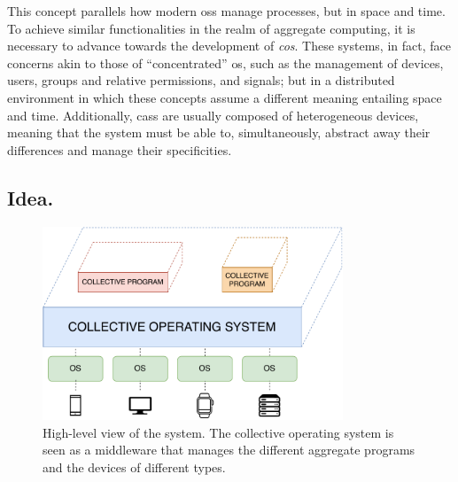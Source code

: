 \documentclass[12pt, a4paper]{article}
\begin{document}
This concept parallels how modern \acp{os} manage processes, but in space and time.
%
To achieve similar functionalities in the realm of aggregate computing,
it is necessary to advance towards the development of \emph{\ac{cos}}.
%
These systems, in fact,
face concerns akin to those of ``concentrated'' \ac{os},
such as the management of devices, users, groups and relative permissions, and signals;
but in a distributed environment in which these concepts assume a different meaning
entailing space and time.
%
Additionally,
\acp{cas} are usually composed of heterogeneous devices,
meaning that the system must be able to,
simultaneously,
abstract away their differences and manage their specificities.

\subsection{Idea.}
\label{subsec:idea.}

\begin{figure}
    \centering
    \includegraphics[width=0.8\textwidth]{figures/system}
    \caption{
        High-level view of the system.
        The collective operating system is seen as a middleware that manages the different aggregate programs and the devices
        of different types.
    }\label{fig:system}
\end{figure}
\end{document}
